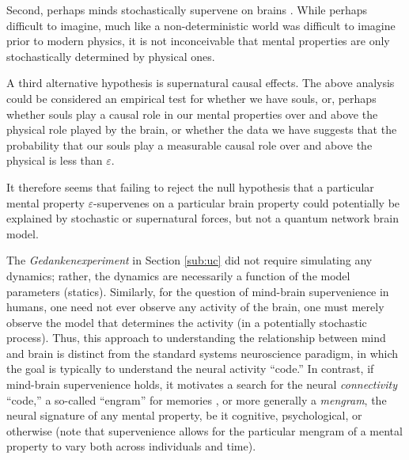 \documentclass{article}
\newcommand{\eps}{\varepsilon}
\begin{document}
Second, perhaps minds stochastically supervene on brains \cite{Craver09}. While perhaps difficult to imagine, 
much like a non-deterministic world was difficult to imagine prior to modern physics, it is not inconceivable that mental properties are only stochastically determined by physical ones.

A third alternative hypothesis is supernatural causal effects.  The above analysis could be considered an empirical test for whether we have souls, or, perhaps whether souls play a causal role in our mental properties over and above the physical role played by the brain, or whether the data we have suggests that the probability that our souls play a measurable causal role over and above the physical is less than $\eps$.

It therefore seems that failing to reject the null hypothesis that a particular mental property $\eps$-supervenes on a particular brain property could potentially be explained by stochastic or supernatural forces, but not a quantum network brain model.




The \emph{Gedankenexperiment} in Section \ref{sub:uc} did not require simulating any dynamics; rather, the dynamics are necessarily a function of the model parameters (statics).  Similarly, for the question of mind-brain supervenience in humans, one need not ever observe any activity of the brain, one must merely observe the model that determines the activity (in a potentially stochastic process). Thus, this approach to understanding the relationship between mind and brain is distinct from the standard systems neuroscience paradigm, in which the goal is typically to understand the neural activity ``code.''  In contrast, if mind-brain supervenience holds, it motivates a search for the neural \emph{connectivity} ``code,'' a so-called ``engram''  for memories \cite{Semon21, Lashley50, ZhangLinden03, ShemaDudai07, BerryDavis08}, or more generally a \emph{mengram}, the neural signature of any mental property, be it cognitive, psychological, or otherwise (note that supervenience allows for the particular mengram of a mental property to vary both across individuals and time).  


\end{document}

